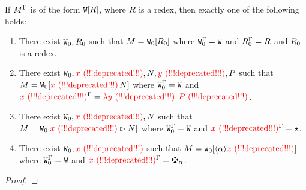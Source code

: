 \begin{lemma}
\label{lem:subst_weak_head_redex}
If $M^{\Gamma}$ is of the form $\mathtt{W}[R]$,
where $R$ is a redex, then exactly one of the following holds:
\begin{enumerate}
\item
  There exist $\mathtt{W}_0,R_0$ such that
  $M = \mathtt{W}_0[R_0]$ 
  where $\mathtt{W}_0^{\Gamma} = \mathtt{W}$
  and $R_0^{\Gamma} = R$
  and $R_0$ is a redex.
\item
  There exist $\mathtt{W}_0,\textcolor{red}{x \text{\,\,(!!!deprecated!!!)}},N,\textcolor{red}{y \text{\,\,(!!!deprecated!!!)}},P$ such that
  $M = \mathtt{W}_0[\textcolor{red}{x \text{\,\,(!!!deprecated!!!)}}\,N]$
  where $\mathtt{W}_0^{\Gamma} = \mathtt{W}$
  and $\textcolor{red}{x \text{\,\,(!!!deprecated!!!)}}^{\Gamma} = \textcolor{red}{\lambda \textcolor{red}{y \text{\,\,(!!!deprecated!!!)}}.\,P \text{\,\,(!!!deprecated!!!)}}$.
\item
  There exist $\mathtt{W}_0,\textcolor{red}{x \text{\,\,(!!!deprecated!!!)}},N$ such that
  $M = \mathtt{W}_0[\textcolor{red}{x \text{\,\,(!!!deprecated!!!)}}\rhd N]$
  where $\mathtt{W}_0^{\Gamma} = \mathtt{W}$
  and $\textcolor{red}{x \text{\,\,(!!!deprecated!!!)}}^{\Gamma} = \star$.
\item
  There exist $\mathtt{W}_0,\textcolor{red}{x \text{\,\,(!!!deprecated!!!)}}$ such that
  $M = \mathtt{W}_0[\langle\alpha\rangle\textcolor{red}{x \text{\,\,(!!!deprecated!!!)}}]$
  where $\mathtt{W}_0^{\Gamma} = \mathtt{W}$
  and $\subs{\var}{\tenv} = \genbtyp$.
\end{enumerate}
\end{lemma}
\begin{proof}
\end{proof}

